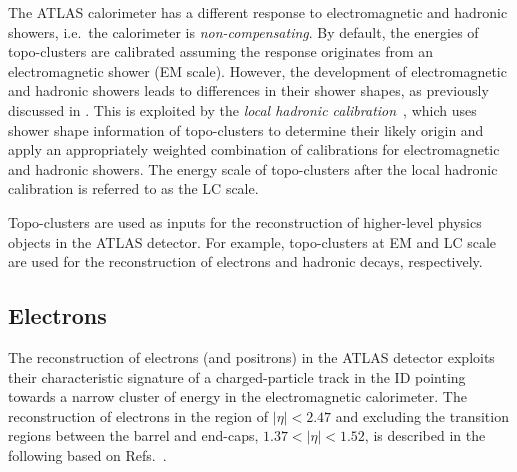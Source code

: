 The ATLAS calorimeter has a different response to electromagnetic and hadronic
showers, i.e.\ the calorimeter is \emph{non-compensating}. By default, the
energies of topo-clusters are calibrated assuming the response originates from
an electromagnetic shower (EM scale). However, the development of
electromagnetic and hadronic showers leads to differences in their shower
shapes, as previously discussed in . This is
exploited by the \emph{local hadronic calibration}~\cite{PERF-2014-07}, which
uses shower shape information of topo-clusters to determine their likely origin
and apply an appropriately weighted combination of calibrations for
electromagnetic and hadronic showers. The energy scale of topo-clusters after
the local hadronic calibration is referred to as the LC scale.

Topo-clusters are used as inputs for the reconstruction of higher-level physics
objects in the ATLAS detector. For example, topo-clusters at EM and LC scale are
used for the reconstruction of electrons and hadronic \taulepton decays,
respectively.


\subsection{Electrons}%
\label{sec:ele_rec}

The reconstruction of electrons (and positrons) in the ATLAS detector exploits
their characteristic signature of a charged-particle track in the ID pointing
towards a narrow cluster of energy in the electromagnetic calorimeter. The
reconstruction of electrons in the region of $|\eta| < 2.47$ and excluding the
transition regions between the barrel and end-caps, $1.37 < |\eta| < 1.52$, is
described in the following based on
Refs.~\cite{ATL-PHYS-PUB-2017-022,EGAM-2018-01}.

